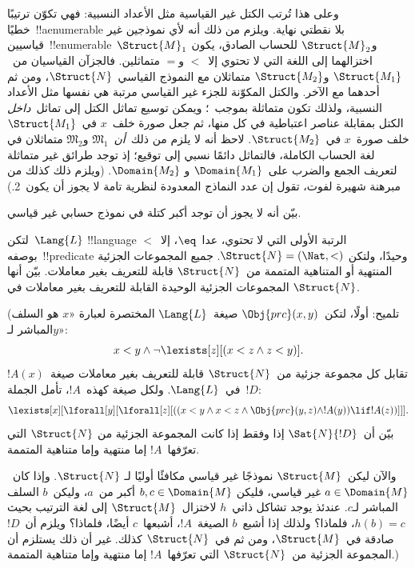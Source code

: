 \documentclass[../../../include/open-logic-section]{subfiles}
\begin{document}
وعلى هذا تُرتب الكتل غير القياسية مثل الأعداد النسبية: فهي تكوّن ترتيبًا
خطيًا~!!a{enumerable} بلا نقطتي نهاية. ويلزم من ذلك أنه لأي نموذجين
غير قياسيين~!!{enumerable}~$\Struct{M}_1$ و$\Struct{M}_2$ للحساب
الصادق، يكون اختزالهما إلى اللغة التي لا تحتوي إلا~$<$ و$=$ متماثلين.
فالجزآن القياسيان من~$\Struct{M_1}$ و$\Struct{M_2}$ متماثلان مع
النموذج القياسي~$\Struct{N}$، ومن ثم أحدهما مع الآخر. والكتل المكوّنة
للجزء غير القياسي مرتبة هي نفسها مثل الأعداد النسبية، ولذلك تكون
متماثلة بموجب~؛ ويمكن توسيع تماثل الكتل إلى
تماثل~\emph{داخل} الكتل بمقابلة عناصر اعتباطية في كل منها، ثم جعل
صورة خلف~$x$ في~$\Struct{M_1}$ خلف صورة~$x$ في~$\Struct{M_2}$. لاحظ
أنه لا يلزم من ذلك~\emph{أن}~$\mathfrak{M}_1$ و$\mathfrak{M}_2$
متماثلان في لغة الحساب الكاملة، فالتماثل دائمًا نسبي إلى توقيع؛ إذ
توجد طرائق غير متماثلة لتعريف الجمع والضرب على~$\Domain{M_1}$ و
$\Domain{M_2}$. (ويلزم ذلك كذلك من مبرهنة شهيرة لفوت، تقول إن عدد
النماذج المعدودة لنظرية تامة لا يجوز أن يكون~2.)

\begin{prob}
بيّن أنه لا يجوز أن توجد أكبر كتلة في نموذج حسابي غير قياسي.
\end{prob}

\begin{prob}
لتكن~$\Lang{L}$ !!{language} الرتبة الأولى التي لا تحتوي، عدا~$\eq$،
إلا~$<$ بوصفه~!!{predicate} وحيدًا، ولتكن
$\Struct{N} = (\Nat,<)$. جميع المجموعات الجزئية المنتهية أو المتناهية
المتممة من~$\Struct{N}$ قابلة للتعريف بغير معاملات. بيّن أنها
المجموعات الجزئية الوحيدة القابلة للتعريف بغير معاملات في
$\Struct{N}$.

(تلميح: أولًا، لتكن~$\Obj{prc}(x,y)$ صيغة~$\Lang{L}$ المختصرة لعبارة
«$x$ هو السلف المباشر لـ$y$»:
\[
x<y \land \lnot \lexists[z][(x<z \land z < y)].
\]
تقابل كل مجموعة جزئية من~$\Struct{N}$ قابلة للتعريف بغير معاملات
صيغة~$!A(x)$ في~$\Lang{L}$. ولكل صيغة كهذه~$!A$، تأمل الجملة~$!D$:
\[
\lexists[x][\lforall[y][\lforall[z][((x<y \land x<z \land \Obj{prc}(y,z)
  \land !A(y)) \lif !A(z))]]].
\]
بيّن أن~$\Sat{N}{!D}$ إذا وفقط إذا كانت المجموعة الجزئية من
$\Struct{N}$ التي تعرّفها~$!A$ إما منتهية وإما متناهية المتممة.

والآن ليكن~$\Struct{M}$ نموذجًا غير قياسي مكافئًا أوليًا لـ
$\Struct{N}$. وإذا كان~$a \in \Domain{M}$ غير قياسي، فليكن
$b, c \in \Domain{M}$ أكبر من~$a$، وليكن~$b$ السلف المباشر لـ$c$.
عندئذ يوجد تشاكل ذاتي~$h$ لاختزال~$\Struct{M}$ إلى لغة الترتيب بحيث
$h(b)=c$، فلماذا؟ ولذلك إذا أشبع~$b$ الصيغة~$!A$، أشبعها~$c$ أيضًا،
فلماذا؟ ويلزم أن~$!D$ صادقة في~$\Struct{M}$، ومن ثم في~$\Struct{N}$
كذلك. غير أن ذلك يستلزم أن المجموعة الجزئية من~$\Struct{N}$ التي
تعرّفها~$!A$ إما منتهية وإما متناهية المتممة.)
\end{prob}
\end{document}
